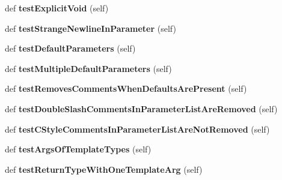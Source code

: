 \begin{DoxyCompactItemize}
def {\bfseries test\+Explicit\+Void} (self)
\item 
\mbox{\label{classcpp_1_1gmock__class__test_1_1GenerateMethodsTest_a184995b077a46f3408fa203cb0626614}} 
def {\bfseries test\+Strange\+Newline\+In\+Parameter} (self)
\item 
\mbox{\label{classcpp_1_1gmock__class__test_1_1GenerateMethodsTest_a61abb614ad02a1fef3ece3813695c22a}} 
def {\bfseries test\+Default\+Parameters} (self)
\item 
\mbox{\label{classcpp_1_1gmock__class__test_1_1GenerateMethodsTest_a41b91cc39a55385b8c4b97d804e80345}} 
def {\bfseries test\+Multiple\+Default\+Parameters} (self)
\item 
\mbox{\label{classcpp_1_1gmock__class__test_1_1GenerateMethodsTest_add445941c6503198f0c3a25e00d20b9f}} 
def {\bfseries test\+Removes\+Comments\+When\+Defaults\+Are\+Present} (self)
\item 
\mbox{\label{classcpp_1_1gmock__class__test_1_1GenerateMethodsTest_abb9fce46de4ac1d2943b85e84ce14c83}} 
def {\bfseries test\+Double\+Slash\+Comments\+In\+Parameter\+List\+Are\+Removed} (self)
\item 
\mbox{\label{classcpp_1_1gmock__class__test_1_1GenerateMethodsTest_afa44c6ac675ce7454ff0f51164bde59e}} 
def {\bfseries test\+C\+Style\+Comments\+In\+Parameter\+List\+Are\+Not\+Removed} (self)
\item 
\mbox{\label{classcpp_1_1gmock__class__test_1_1GenerateMethodsTest_ade05313ccffe74f9eaa42fb66c14f702}} 
def {\bfseries test\+Args\+Of\+Template\+Types} (self)
\item 
\mbox{\label{classcpp_1_1gmock__class__test_1_1GenerateMethodsTest_a747b7b1b9da071eb8e1e2b84c7ee3614}} 
def {\bfseries test\+Return\+Type\+With\+One\+Template\+Arg} (self)

\end{DoxyCompactItemize}
